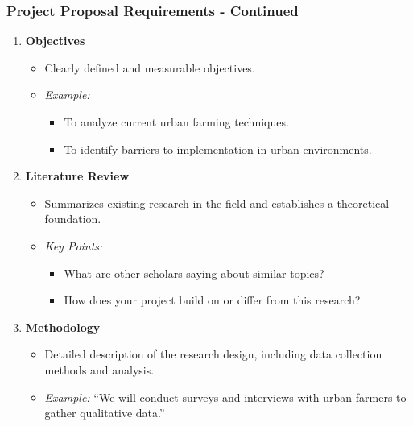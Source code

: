 \documentclass[aspectratio=169]{beamer}
\begin{document}
\begin{frame}[fragile]
    \frametitle{Project Proposal Requirements - Continued}
    \begin{enumerate}[resume]
        \item \textbf{Objectives}
            \begin{itemize}
                \item Clearly defined and measurable objectives.
                \item \textit{Example:} 
                \begin{itemize}
                    \item To analyze current urban farming techniques.
                    \item To identify barriers to implementation in urban environments.
                \end{itemize}
            \end{itemize}
        \item \textbf{Literature Review}
            \begin{itemize}
                \item Summarizes existing research in the field and establishes a theoretical foundation.
                \item \textit{Key Points:}
                    \begin{itemize}
                        \item What are other scholars saying about similar topics?
                        \item How does your project build on or differ from this research?
                    \end{itemize}
            \end{itemize}
        \item \textbf{Methodology}
            \begin{itemize}
                \item Detailed description of the research design, including data collection methods and analysis.
                \item \textit{Example:} ``We will conduct surveys and interviews with urban farmers to gather qualitative data.''
            \end{itemize}
    \end{enumerate}
\end{frame}
\end{document}
